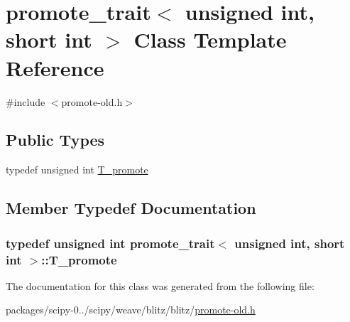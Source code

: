 \hypertarget{classpromote__trait_3_01unsigned_01int_00_01short_01int_01_4}{}\section{promote\+\_\+trait$<$ unsigned int, short int $>$ Class Template Reference}
\label{classpromote__trait_3_01unsigned_01int_00_01short_01int_01_4}


{\ttfamily \#include $<$promote-\/old.\+h$>$}

\subsection*{Public Types}
\begin{DoxyCompactItemize}
\item 
typedef unsigned int \hyperlink{classpromote__trait_3_01unsigned_01int_00_01short_01int_01_4_abddaa3ed63eb18793da42a4b37d84396}{T\+\_\+promote}
\end{DoxyCompactItemize}


\subsection{Member Typedef Documentation}
\hypertarget{classpromote__trait_3_01unsigned_01int_00_01short_01int_01_4_abddaa3ed63eb18793da42a4b37d84396}{}
\subsubsection[{T\+\_\+promote}]{\setlength{\rightskip}{0pt plus 5cm}typedef unsigned int {\bf promote\+\_\+trait}$<$ unsigned int, short int $>$\+::{\bf T\+\_\+promote}}\label{classpromote__trait_3_01unsigned_01int_00_01short_01int_01_4_abddaa3ed63eb18793da42a4b37d84396}


The documentation for this class was generated from the following file\+:\begin{DoxyCompactItemize}
\item 
packages/scipy-\/0../scipy/weave/blitz/blitz/\hyperlink{promote-old_8h}{promote-\/old.\+h}\end{DoxyCompactItemize}
